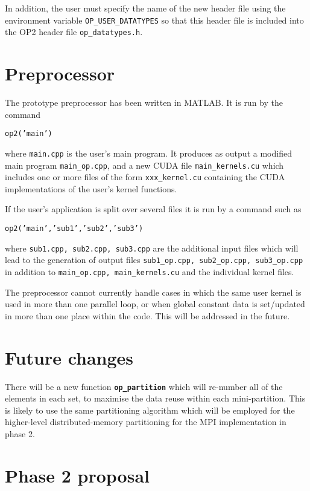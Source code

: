\documentclass[11pt]{article}
\begin{document}
In addition, the user must specify the name of the new header file using the 
environment variable {\tt OP\_USER\_DATATYPES}
so that this header file is included into the OP2 header file {\tt op\_datatypes.h}.


\newpage


\section{Preprocessor}

The prototype preprocessor has been written in MATLAB.  It is run by the command

{\tt op2('main')}

\noindent
where {\tt main.cpp} is the user's main program.  It produces as output a 
modified main program {\tt main\_op.cpp}, and a new CUDA file {\tt main\_kernels.cu}
which includes one or more files of the form {\tt xxx\_kernel.cu} containing 
the CUDA implementations of the user's kernel functions.

If the user's application is split over several files it is run by a command such as

{\tt op2('main','sub1','sub2','sub3')}

\noindent
where {\tt sub1.cpp, sub2.cpp, sub3.cpp} are the additional input files which will 
lead to the generation of output files {\tt sub1\_op.cpp, sub2\_op.cpp, sub3\_op.cpp} 
in addition to {\tt main\_op.cpp, main\_kernels.cu} and the individual kernel files.

The preprocessor cannot currently handle cases in which the same user kernel is 
used in more than one parallel loop, or when global constant data is set/updated 
in more than one place within the code.  This will be addressed in the future.


\section{Future changes}

There will be a new function {\tt \bf op\_partition} which will re-number 
all of the elements in each set, to maximise the data reuse within each 
mini-partition.  This is likely to use the same partitioning algorithm which
will be employed for the higher-level distributed-memory partitioning for the
MPI implementation in phase 2.

\newpage

\section{Phase 2 proposal}
\end{document}
